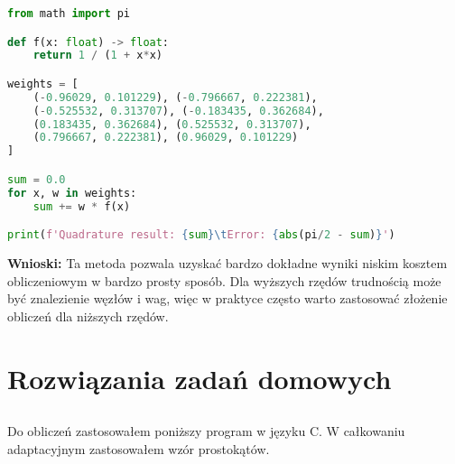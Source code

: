 \documentclass{article}
\begin{document}
\begin{lstlisting}[language=Python]
from math import pi

def f(x: float) -> float:
    return 1 / (1 + x*x)

weights = [
    (-0.96029, 0.101229), (-0.796667, 0.222381),
    (-0.525532, 0.313707), (-0.183435, 0.362684),
    (0.183435, 0.362684), (0.525532, 0.313707),
    (0.796667, 0.222381), (0.96029, 0.101229)
]

sum = 0.0
for x, w in weights:
    sum += w * f(x)

print(f'Quadrature result: {sum}\tError: {abs(pi/2 - sum)}')
\end{lstlisting}

\noindent
\textbf{Wnioski:} Ta metoda pozwala uzyskać bardzo dokładne wyniki niskim kosztem obliczeniowym w bardzo prosty sposób. Dla wyższych rzędów trudnością może być znalezienie węzłów i wag, więc w praktyce często warto zastosować złożenie obliczeń dla niższych rzędów.

\newpage

\section{Rozwiązania zadań domowych}

\subsection{}
Do obliczeń zastosowałem poniższy program w języku C. W całkowaniu adaptacyjnym zastosowałem wzór prostokątów.
\end{document}
